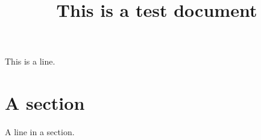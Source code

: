 \documentclass{article}
\title{This is a test document}
\begin{document}
\maketitle

This is a line.

\section{A section}

A line in a section.
\end{document}
